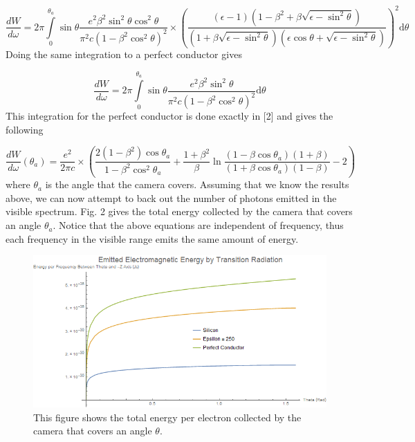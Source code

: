 \documentclass[12pt]{article}
\begin{document}
\begin{equation}
\frac{dW} {d \omega} =2 \pi \int\limits_0^{\theta_{a}} \sin \theta \frac{e^{2} \beta^{2} \sin^2 \theta \cos^2 \theta} {\pi^{2} c (1-\beta^{2} \cos^2 \theta)^{2}} \times \left( \frac{(\epsilon -1) (1-\beta^{2}+\beta \sqrt{\epsilon-\sin^2 \theta})} {(1+\beta \sqrt{\epsilon-\sin^2 \theta}) (\epsilon \cos \theta + \sqrt{\epsilon- \sin^2 \theta})} \right)^{2} \mathrm{d} \theta
\end{equation}
Doing the same integration to a perfect conductor gives

\begin{equation}
\frac{dW} {d \omega} =2 \pi \int\limits_0^{\theta_{a}} \sin \theta \frac{e^{2} \beta^{2} \sin^2 \theta} {\pi^{2} c (1-\beta^{2} \cos^2 \theta)^{2}} \mathrm{d} \theta
\end{equation}
This integration for the perfect conductor is done exactly in [2] and gives the following

\begin{equation}
\frac{dW} {d \omega} (\theta_{a}) =\frac{e^{2}} {2 \pi c} \times \left( \frac{2(1-\beta^{2}) \cos \theta_{a}}{1-\beta^2 \cos^2 \theta_{a}}+\frac{1+\beta^{2}}{\beta} \ln{\frac{(1-\beta \cos \theta_{a})(1+\beta)}{(1+\beta \cos \theta_{a})(1-\beta)}}-2 \right)
\end{equation}
where $\theta_a$ is the angle that the camera covers. Assuming that we know the results above, we can now attempt to back out the number of photons emitted in the visible spectrum. Fig. 2 gives the total energy collected by the camera that covers an angle $\theta_a$. Notice that the above equations are independent of frequency, thus each frequency in the visible range emits the same amount of energy. 

\begin{figure}
\begin{center}
\includegraphics[scale=0.5]{Energy2.PNG}
\caption{This figure shows the total energy per electron collected by the camera that covers an angle $\theta$.}
\end{center}
\end{figure}
\end{document}
